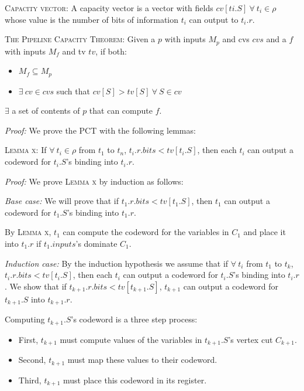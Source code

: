\noindent \textsc{Capacity vector:} A capacity vector is a vector with fields $cv[ti.S]\ \forall\ t_i \in \rho$ whose value is the number of bits of information $t_i$ can output to $t_i.r$.
\vspace{2mm}

\noindent \textsc{The Pipeline Capacity Theorem:} Given a $p$ with inputs $M_p$ and cvs $cvs$ and a $f$ with inputs $M_f$ and tv $tv$, if both:
\begin{itemize}
  \item $M_f \subseteq M_p$ 
  \item $\exists\ cv \in cvs$ such that $cv[S] > tv[S]\ \forall\ S \in cv$
\end{itemize}
$\exists$ a set of contents of $p$ that can compute $f$.
\vspace{2mm}

\noindent \textit{Proof:} We prove the PCT with the following lemmas:

\noindent \textsc{Lemma x:} If $\forall\ t_i \in \rho$ from $t_1$ to $t_n$, $t_i.r.bits < tv[t_i.S]$, then each $t_i$ can output a codeword for $t_i.S$'s binding into $t_i.r$.
\vspace{2mm}

\noindent \textit{Proof:} We prove \textsc{Lemma x} by induction as follows:
\vspace{2mm}

\noindent \textit{Base case:} We will prove that if $t_1.r.bits < tv[t_1.S]$, then $t_1$ can output a codeword for $t_1.S$'s binding into $t_1.r$.

By \textsc{Lemma x}, $t_1$ can compute the codeword for the variables in $C_1$ and place it into $t_1.r$ if $t_1.inputs$'s dominate $C_1$. 
\vspace{2mm}

\noindent \textit{Induction case:} By the induction hypothesis we assume that if $\forall\ t_i$ from $t_1$ to $t_k$, $t_i.r.bits < tv[t_i.S]$, then each $t_i$ can output a codeword for $t_i.S$'s binding into $t_i.r$. We show that if $t_{k+1}.r.bits < tv[t_{k+1}.S]$, $t_{k+1}$ can output a codeword for $t_{k+1}.S$ into $t_{k+1}.r$.

Computing $t_{k+1}.S$'s codeword is a three step process:
\begin{itemize}
  \item First, $t_{k+1}$ must compute values of the variables in $t_{k+1}.S$'s vertex cut $C_{k+1}$.

  \item Second, $t_{k+1}$ must map these values to their codeword.

  \item Third, $t_{k+1}$ must place this codeword in its register.
\end{itemize}

